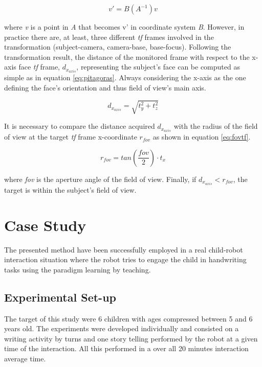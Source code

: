 \documentclass{sig-alternate}
\begin{document}
\begin{equation}
v' = B(A^{-1})v
\label{eq:transform}
\end{equation}

where \textit{v} is a point in \textit{A} that becomes v' in coordinate system \textit{B}. However, in practice there are, at least, three different \textit{tf} frames involved in the transformation (subject-camera, camera-base, base-focus). Following the transformation result, the distance of the monitored frame with respect to the x-axis face \textit{tf} frame, $ d_{x_{axis}} $, representing the subject's face can be computed as simple as in equation \ref{eq:pitagoras}. Always considering the x-axis as the one defining the face's orientation and thus field of view's main axis.

\begin{equation}
d_{x_{axis}} = \sqrt{t_y^2 + t_z^2}
\label{eq:pitagoras}
\end{equation}

It is necessary to compare the distance acquired $ d_{x_{axis}} $ with the radius of the field of view at the target \textit{tf} frame x-coordinate $ r_{fov} $ as shown in equation \ref{eq:fovtf}.

\begin{equation}
r_{fov} = tan\left(\frac{fov}{2}\right) \cdot t_x
\label{eq:fovtf}
\end{equation}

where \textit{fov} is the aperture angle of the field of view. Finally, if $ d_{x_{axis}}<r_{fov} $, the target is within the subject's field of view.


\section{Case Study}
The presented method have been successfully employed in a real child-robot interaction situation where the robot tries to engage the child in handwriting tasks using the paradigm learning by teaching.
\subsection{Experimental Set-up}

The target of this study were 6 children with ages compressed between 5 and 6 years old. The experiments were developed individually and consisted on a writing activity by turns and one story telling performed by the robot at a given time of the interaction. All this performed in a over all 20 minutes interaction average time.
\end{document}
